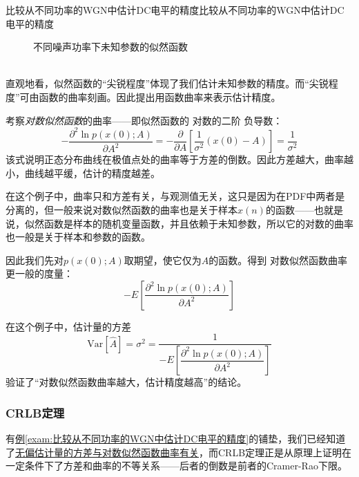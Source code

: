 \begin{example}{比较从不同功率的WGN中估计DC电平的精度}{比较从不同功率的WGN中估计DC电平的精度}
            \begin{wrapfigure}[1]{r}{\textwidth}
                \vspace{-20pt}
                \caption{\kaishu 不同噪声功率下未知参数的似然函数}\label{Fig: 不同噪声功率下未知参数的似然函数}
            \end{wrapfigure}
            ~\\

            直观地看，似然函数的“尖锐程度”体现了我们估计未知参数的精度。而“尖锐程度”可由函数的曲率刻画。因此提出用函数曲率来表示估计精度。

            考察\emph{对数似然函数}的曲率——即似然函数的{\color{red!80!black} 对数}的二阶{\color{red!80!black} 负}导数：
            \begin{equation}
                -\frac{\partial^2\ln p(x(0);A)}{\partial A^2}=-\frac{\partial }{\partial A}\left[\frac{1}{\sigma^2}\left(x(0)-A\right)\right]=\frac{1}{\sigma^2}
            \end{equation}
            该式说明正态分布曲线在极值点处的曲率等于方差的倒数。因此方差越大，曲率越小，曲线越平缓，估计的精度越差。

            在这个例子中，曲率只和方差有关，与观测值无关，这只是因为在PDF中两者是分离的，但一般来说对数似然函数的曲率也是关于样本$x(n)$的函数——也就是说，似然函数是样本的随机变量函数，并且依赖于未知参数，所以它的对数的曲率也一般是关于样本和参数的函数。

            因此我们先对$p(x(0);A)$取期望，使它仅为$A$的函数。得到 对数似然函数曲率 更一般的度量：
            \begin{equation}
                -E\left[\frac{\partial^2\ln p(x(0);A)}{\partial A^2}\right]
            \end{equation}

            在这个例子中，估计量的方差
            \begin{equation*}
                \mathrm{Var}\left[\hat{A}\right]=\sigma^2=
                \dfrac{1}{-E\left[\dfrac{\partial^2\ln p(x(0);A)}{\partial A^2}\right]}
            \end{equation*}
            验证了“对数似然函数曲率越大，估计精度越高”的结论。
        \end{example}

        \subsubsection{CRLB定理}

        有\hyperref[exam:比较从不同功率的WGN中估计DC电平的精度]{例\ref*{exam:比较从不同功率的WGN中估计DC电平的精度}}的铺垫，我们已经知道了\underline{无偏估计量的方差与对数似然函数曲率有关}，而CRLB定理正是从原理上证明在一定条件下了方差和曲率的不等关系——后者的倒数是前者的Cramer-Rao下限。
        
